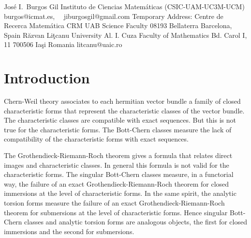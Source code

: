 \documentclass[10pt,twoside]{article}
\numberwithin{equation}{section}
\theoremstyle{plain}
\theoremstyle{definition}
\begin{document}
\Address 
Jos\'e I.~Burgos Gil
Instituto de Ciencias Matem\'aticas 
(CSIC-UAM-UC3M-UCM)
burgos@icmat.es, 
\ \ jiburgosgil@gmail.com
Temporary Address:
Centre de Recerca Matem\'atica CRM
UAB Science Faculty
08193 Bellaterra
Barcelona, Spain
\Address
R\u azvan Li\c tcanu
University Al. I. Cuza
Faculty of Mathematics
Bd. Carol I, 11
700506 Ia\c si
Romania
litcanu@uaic.ro
\Address
\Address
\EndAddress
\setcounter{tocdepth}{2}
\setcounter{section}{-1}
\date{}
\vspace*{2cm} 




\newpage

\tableofcontents


\section{Introduction}
\label{sec:introduction}

Chern-Weil theory associates to each hermitian vector
bundle a family of closed characteristic forms that represent the
characteristic classes of the vector bundle. The characteristic
classes are compatible with exact sequences. But this is not true for
the characteristic forms. The Bott-Chern classes measure the lack of
compatibility of the characteristic forms with exact sequences.

The Grothendieck-Riemann-Roch theorem gives a formula that relates
direct images and characteristic classes. In general this formula is
not valid for the characteristic forms. The singular Bott-Chern
classes measure, in a functorial way, the failure of an exact
Grothendieck-Riemann-Roch theorem for
closed immersions at the level of characteristic forms. In the same
spirit, the analytic torsion forms 
measure the failure of an exact
Grothendieck-Riemann-Roch theorem for
submersions at the level of characteristic forms. Hence singular
Bott-Chern classes and analytic torsion 
forms are analogous objects, the first for closed immersions and the
second for submersions. 
\end{document}
